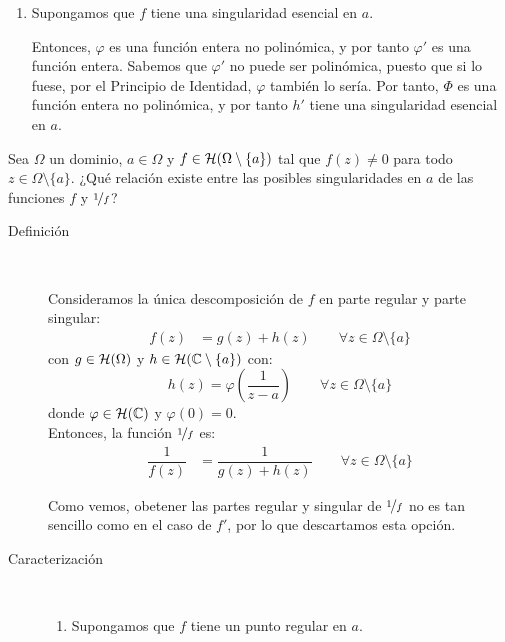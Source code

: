 \begin{ejercicio}
\begin{enumerate}
        \item Supongamos que $f$ tiene una singularidad esencial en $a$.
        
        Entonces, $\varphi$ es una función entera no polinómica, y por tanto $\varphi'$ es una función entera. Sabemos que $\varphi'$ no puede ser polinómica, puesto que si lo fuese, por el Principio de Identidad, $\varphi$ también lo sería. Por tanto, $\Phi$ es una función entera no polinómica, y por tanto $h'$ tiene una singularidad esencial en $a$.
    \end{enumerate}
\end{ejercicio}

\begin{ejercicio}
    Sea $\Omega$ un dominio, $a \in \Omega$ y $f \in \mathcal{H}(\Omega \setminus \{a\})$ tal que $f(z) \neq 0$ para todo $z \in \Omega \setminus \{a\}$. ¿Qué relación existe entre las posibles singularidades en $a$ de las funciones $f$ y $\nicefrac{1}{f}$?

    \begin{description}
        \item[Definición]~
        
        Consideramos la única descomposición de $f$ en parte regular y parte singular:
        \begin{align*}
            f(z) &= g(z) + h(z)\qquad \forall z \in \Omega \setminus \{a\}
        \end{align*}
        con $g\in \mathcal{H}(\Omega)$ y $h \in \mathcal{H}(\mathbb{C} \setminus \{a\})$ con:
        \begin{equation*}
            h(z) = \varphi\left(\dfrac{1}{z - a}\right) \qquad \forall z \in \Omega \setminus \{a\}
        \end{equation*}
        donde $\varphi\in \mathcal{H}(\mathbb{C})$ y $\varphi(0)=0$.\\

        Entonces, la función $\nicefrac{1}{f}$ es:
        \begin{align*}
            \dfrac{1}{f(z)} &= \dfrac{1}{g(z) + h(z)} \qquad \forall z \in \Omega \setminus \{a\}
        \end{align*}

        Como vemos, obetener las partes regular y singular de $\nicefrac{1}{f}$ no es tan sencillo como en el caso de $f'$, por lo que descartamos esta opción.

        \item[Caracterización]~
        
        \begin{enumerate}
            \item Supongamos que $f$ tiene un punto regular en $a$.
            

\end{enumerate}
\end{description}
\end{ejercicio}
